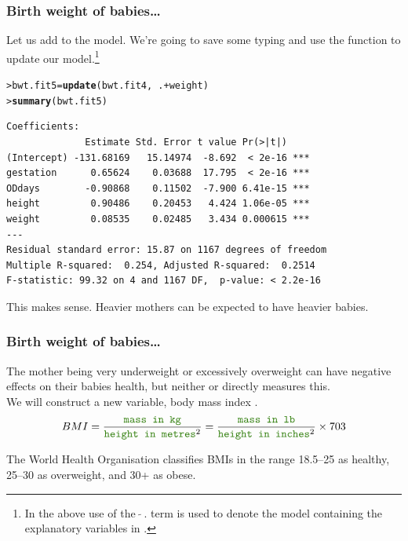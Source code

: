 \documentclass{beamer}\usepackage[]{graphicx}\usepackage[]{xcolor}
\makeatletter
\newcommand{\hlopt}[1]{\textcolor[rgb]{0,0,0}{#1}}%
\newcommand{\hlstd}[1]{\textcolor[rgb]{0.345,0.345,0.345}{#1}}%
\newcommand{\hlkwb}[1]{\textcolor[rgb]{0.69,0.353,0.396}{#1}}%
\newcommand{\hlkwd}[1]{\textcolor[rgb]{0.737,0.353,0.396}{\textbf{#1}}}%
\newenvironment{kframe}{%
 \def\at@end@of@kframe{}%
 \ifinner\ifhmode%
  \def\at@end@of@kframe{\end{minipage}}%
  \begin{minipage}{\columnwidth}%
 \fi\fi%
 \def\FrameCommand##1{\hskip\@totalleftmargin \hskip-\fboxsep
 \colorbox{shadecolor}{##1}\hskip-\fboxsep
     \hskip-\linewidth \hskip-\@totalleftmargin \hskip\columnwidth}%
 \MakeFramed {\advance\hsize-\width
   \@totalleftmargin\z@ \linewidth\hsize
   \@setminipage}}%
 {\par\unskip\endMakeFramed%
 \at@end@of@kframe}
\newenvironment{knitrout}{}{} %
\makeatother
\begin{document}
\begin{frame}[fragile]
\frametitle{Birth weight of babies\ldots}
Let us add  to the model. We're going to save some typing and use the  function to update our model.\footnote{In the above use of  the $~\tilde{} ~ .$ term is used to denote the model containing the explanatory variables in .}
\medskip
\begin{knitrout}\scriptsize
{}\color{fgcolor}\begin{kframe}
\begin{alltt}
\hlstd{> }\hlstd{bwt.fit5} \hlkwb{=} \hlkwd{update}\hlstd{(bwt.fit4,}\hlopt{~}\hlstd{.} \hlopt{+} \hlstd{weight)}
\hlstd{> }\hlkwd{summary}\hlstd{(bwt.fit5)}
\end{alltt}
\end{kframe}
\end{knitrout}

\begin{knitrout}\scriptsize
{}\color{fgcolor}\begin{kframe}
\begin{verbatim}
Coefficients:
              Estimate Std. Error t value Pr(>|t|)    
(Intercept) -131.68169   15.14974  -8.692  < 2e-16 ***
gestation      0.65624    0.03688  17.795  < 2e-16 ***
ODdays        -0.90868    0.11502  -7.900 6.41e-15 ***
height         0.90486    0.20453   4.424 1.06e-05 ***
weight         0.08535    0.02485   3.434 0.000615 ***
---
Residual standard error: 15.87 on 1167 degrees of freedom
Multiple R-squared:  0.254,	Adjusted R-squared:  0.2514 
F-statistic: 99.32 on 4 and 1167 DF,  p-value: < 2.2e-16
\end{verbatim}
\end{kframe}
\end{knitrout}

This makes sense. Heavier mothers can be expected to have heavier babies.
\end{frame}


\begin{frame}[fragile]
\frametitle{Birth weight of babies\ldots}
The mother being very underweight or excessively overweight can have negative effects
on their babies health, but neither  or  directly
measures this.\\
\bigskip
We will construct a new variable, body mass index .\\
\bigskip
\[
BMI = \frac{\rcode{mass in kg}}{\rcode{height in metres}^2} =\frac{\rcode{mass in lb}}{\rcode{height in inches}^2}\times 703
\]

\bigskip
The World Health Organisation classifies BMIs in the range 18.5--25 as healthy,
25--30 as overweight, and 30+ as obese.
\end{frame}
\end{document}
